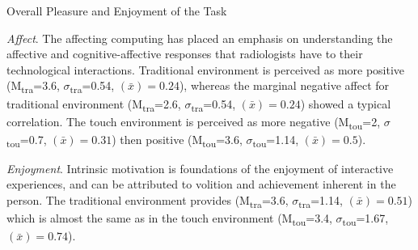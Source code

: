 \documentclass[sigchi-a, authorversion]{acmart}
\begin{document}
\begin{margintable}
\caption{Overall Pleasure and Enjoyment of the Task}
\label{fig:Fig11}
\end{margintable}

\textit{Affect}. The affecting computing has placed an emphasis on understanding the affective and cognitive-affective responses that radiologists have to their technological interactions. Traditional environment is perceived as more positive (M\textsubscript{tra}=3.6, $\sigma$\textsubscript{tra}=0.54, {}$\left({\bar x}\right)=0.24$), whereas the marginal negative affect for traditional environment (M\textsubscript{tra}=2.6, $\sigma$\textsubscript{tra}=0.54, {}$\left({\bar x}\right)=0.24$) showed a typical correlation. The touch environment is perceived as more negative (M\textsubscript{tou}=2, $\sigma$\textsubscript{tou}=0.7, {}$\left({\bar x}\right)=0.31$) then positive (M\textsubscript{tou}=3.6, $\sigma$\textsubscript{tou}=1.14, {}$\left({\bar x}\right)=0.5$).

\textit{Enjoyment}. Intrinsic motivation is foundations of the enjoyment of interactive experiences, and can be attributed to volition and achievement inherent in the person. The traditional environment provides (M\textsubscript{tra}=3.6, $\sigma$\textsubscript{tra}=1.14, {}$\left({\bar x}\right)=0.51$) which is almost the same as in the touch environment (M\textsubscript{tou}=3.4, $\sigma$\textsubscript{tou}=1.67, {}$\left({\bar x}\right)=0.74$).
 
\end{document}
